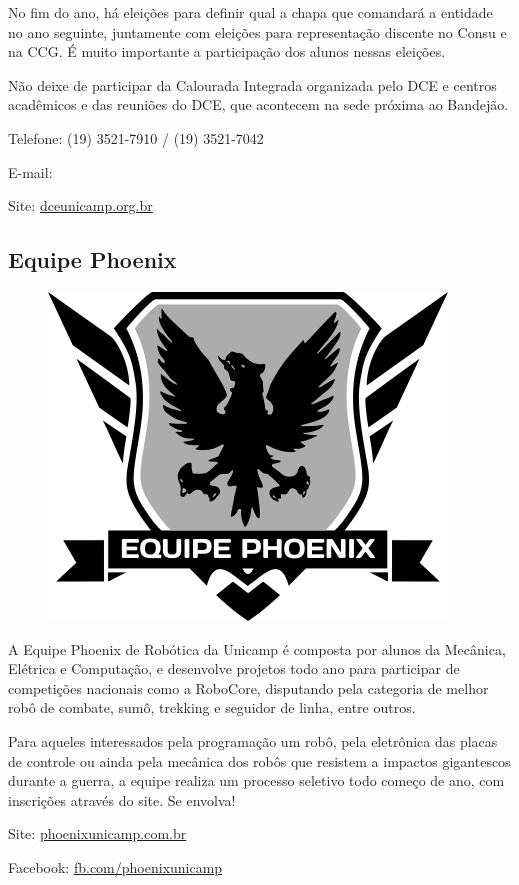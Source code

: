 No fim do ano, há eleições para definir qual a chapa que comandará a entidade no
ano seguinte, juntamente com eleições para representação discente no Consu e na
CCG. É muito importante a participação dos alunos nessas eleições.

Não deixe de participar da Calourada Integrada organizada pelo DCE e centros
acadêmicos e das reuniões do DCE, que acontecem na sede próxima ao Bandejão.

\begin{compactitemize}
    \item  Telefone: (19) 3521-7910 / (19) 3521-7042
    \item  E-mail: 
    \item  Site: \url{dceunicamp.org.br}
\end{compactitemize}

\subsection{Equipe Phoenix}

\begin{figure}[h!]
    \centering
    \includegraphics[width=.35\textwidth]{img/alem_da_graduacao/phoenix_logo.png}
\end{figure}

A Equipe Phoenix de Robótica da Unicamp é composta por alunos da Mecânica,
Elétrica e Computação, e desenvolve projetos todo ano para participar de
competições nacionais como a RoboCore, disputando pela categoria de melhor robô
de combate, sumô, trekking e seguidor de linha, entre outros.

Para aqueles interessados pela programação um robô, pela eletrônica das placas
de controle ou ainda pela mecânica dos robôs que resistem a impactos gigantescos
durante a guerra, a equipe realiza um processo seletivo todo começo de ano, com
inscrições através do site. Se envolva!

\begin{compactitemize}
    \item  Site: \url{phoenixunicamp.com.br}
    \item  Facebook: \url{fb.com/phoenixunicamp}
\end{compactitemize}

